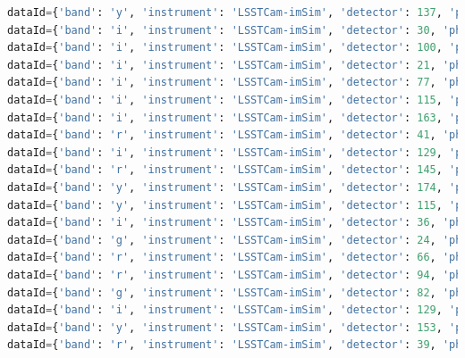 \documentclass[DM,authoryear,toc]{lsstdoc}
\begin{document}
\begin{lstlisting}[language=Python, basicstyle=\tiny]
dataId={'band': 'y', 'instrument': 'LSSTCam-imSim', 'detector': 137, 'physical_filter': 'y_sim_1.4', 'visit': 1012086} records=None
dataId={'band': 'i', 'instrument': 'LSSTCam-imSim', 'detector': 30, 'physical_filter': 'i_sim_1.4', 'visit': 1029810} records=None
dataId={'band': 'i', 'instrument': 'LSSTCam-imSim', 'detector': 100, 'physical_filter': 'i_sim_1.4', 'visit': 1013734} records=None
dataId={'band': 'i', 'instrument': 'LSSTCam-imSim', 'detector': 21, 'physical_filter': 'i_sim_1.4', 'visit': 1030664} records=None
dataId={'band': 'i', 'instrument': 'LSSTCam-imSim', 'detector': 77, 'physical_filter': 'i_sim_1.4', 'visit': 645659} records=None
dataId={'band': 'i', 'instrument': 'LSSTCam-imSim', 'detector': 115, 'physical_filter': 'i_sim_1.4', 'visit': 1029804} records=None
dataId={'band': 'i', 'instrument': 'LSSTCam-imSim', 'detector': 163, 'physical_filter': 'i_sim_1.4', 'visit': 1030669} records=None
dataId={'band': 'r', 'instrument': 'LSSTCam-imSim', 'detector': 41, 'physical_filter': 'r_sim_1.4', 'visit': 1052890} records=None
dataId={'band': 'i', 'instrument': 'LSSTCam-imSim', 'detector': 129, 'physical_filter': 'i_sim_1.4', 'visit': 645659} records=None
dataId={'band': 'r', 'instrument': 'LSSTCam-imSim', 'detector': 145, 'physical_filter': 'r_sim_1.4', 'visit': 1049335} records=None
dataId={'band': 'y', 'instrument': 'LSSTCam-imSim', 'detector': 174, 'physical_filter': 'y_sim_1.4', 'visit': 1056411} records=None
dataId={'band': 'y', 'instrument': 'LSSTCam-imSim', 'detector': 115, 'physical_filter': 'y_sim_1.4', 'visit': 1012086} records=None
dataId={'band': 'i', 'instrument': 'LSSTCam-imSim', 'detector': 36, 'physical_filter': 'i_sim_1.4', 'visit': 1029810} records=None
dataId={'band': 'g', 'instrument': 'LSSTCam-imSim', 'detector': 24, 'physical_filter': 'g_sim_1.4', 'visit': 1039916} records=None
dataId={'band': 'r', 'instrument': 'LSSTCam-imSim', 'detector': 66, 'physical_filter': 'r_sim_1.4', 'visit': 1006099} records=None
dataId={'band': 'r', 'instrument': 'LSSTCam-imSim', 'detector': 94, 'physical_filter': 'r_sim_1.4', 'visit': 1038222} records=None
dataId={'band': 'g', 'instrument': 'LSSTCam-imSim', 'detector': 82, 'physical_filter': 'g_sim_1.4', 'visit': 1039948} records=None
dataId={'band': 'i', 'instrument': 'LSSTCam-imSim', 'detector': 129, 'physical_filter': 'i_sim_1.4', 'visit': 1030665} records=None
dataId={'band': 'y', 'instrument': 'LSSTCam-imSim', 'detector': 153, 'physical_filter': 'y_sim_1.4', 'visit': 1033987} records=None
dataId={'band': 'r', 'instrument': 'LSSTCam-imSim', 'detector': 39, 'physical_filter': 'r_sim_1.4', 'visit': 1006037} records=None

\end{lstlisting}
\end{document}
